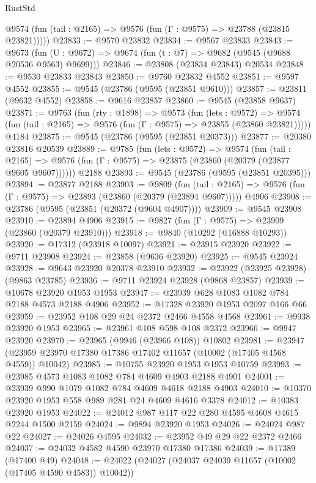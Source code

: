 \begin{lexlean}{RustStd}
\begin{coremodule}
      @9574 (fun (tail : @2165) => @9576 (fun (Γ : @9575) => @23788 (@23815 @23821)))))
@23833 := @9570 @23832
@23834 := @9567 @23833
@23843 := @9673
    (fun (U : @9672) => @9674 (fun (t : @7) => @9682 (@9545 (@9688 @20536 @9563) @9699)))
@23846 := @23808 (@23834 @23843) @20534
@23848 := @9530 @23833 @23843
@23850 := @9760 @23832 @4552
@23851 := @9597 @4552
@23855 := @9545 (@23786 (@9595 (@23851 @9610)))
@23857 := @23811 (@9632 @4552)
@23858 := @9616 @23857
@23860 := @9545 (@23858 @9637)
@23871 := @9763
    (fun (rty : @1898) =>
    @9573
      (fun (lets : @9572) =>
      @9574 (fun (tail : @2165) => @9576 (fun (Γ : @9575) => @23855 (@23860 @23821)))))
    @4184
@23875 := @9545 (@23786 (@9595 (@23851 @20373)))
@23877 := @20380 @23816 @20539
@23889 := @9785
    (fun (lets : @9572) =>
    @9574
      (fun (tail : @2165) =>
      @9576 (fun (Γ : @9575) => @23875 (@23860 (@20379 (@23877 @9605 @9607))))))
    @2188
@23893 := @9545 (@23786 (@9595 (@23851 @20395)))
@23894 := @23877 @2188
@23903 := @9809
    (fun (tail : @2165) => @9576 (fun (Γ : @9575) => @23893 (@23860 (@20379 (@23894 @9607)))))
    @4906
@23908 := @23786 (@9595 (@23851 (@20372 (@9604 @4907))))
@23909 := @9545 @23908
@23910 := @23894 @4906
@23915 := @9827 (fun (Γ : @9575) => @23909 (@23860 (@20379 @23910)))
@23918 := @9840 (@10292 (@16888 @10293))
@23920 := @17312 (@23918 @10097)
@23921 := @23915 @23920
@23922 := @9711 @23908
@23924 := @23858 (@9636 @23920)
@23925 := @9545 @23924
@23928 := @9643 @23920 @20378 @23910
@23932 := @23922 (@23925 @23928) (@9863 @23785)
@23936 := @9711 @23924 @23928 (@9868 @23857)
@23939 := @10678 @23920 @1953 @1953
@23947 := @23939 @628 @1083 @1082 @784 @2188 @4573 @2188 @4906
@23952 := @17328 @23920 @1953 @2097 @166 @66
@23959 := @23952 @108 @29 @24 @2372 @2466 @4558 @4568
@23961 := @9938 @23920 @1953
@23965 := @23961 @108 @598 @108 @2372
@23966 := @9947 @23920
@23970 := @23965 (@9946 (@23966 @108)) @10802
@23981 := @23947 (@23959 @23970 @17380 @17386 @17402 @11657 (@10002 (@17405 @4568 @4559)) @10042)
@23985 := @10755 @23920 @1953 @1953 @10759
@23993 := @23985 @4573 @1083 @1082 @784 @4609 @4903 @2188 @4901
@24001 := @23939 @990 @1079 @1082 @784 @4609 @4618 @2188 @4903
@24010 := @10370 @23920 @1953 @558 @989 @281 @24 @4609 @4616 @3378
@24012 := @10383 @23920 @1953
@24022 := @24012 @987 @117 @22 @280 @4595 @4608 @4615 @2244 @1500 @2159
@24024 := @9894 @23920 @1953
@24026 := @24024 @987 @22
@24027 := @24026 @4595
@24032 := @23952 @49 @29 @22 @2372 @2466
@24037 := @24032 @4582 @4590 @23970 @17380 @17386
@24039 := @17389 (@17400 @49)
@24048 := @24022 (@24027 (@24037 @24039 @11657 (@10002 (@17405 @4590 @4583)) @10042))

\end{coremodule}
\end{lexlean}

